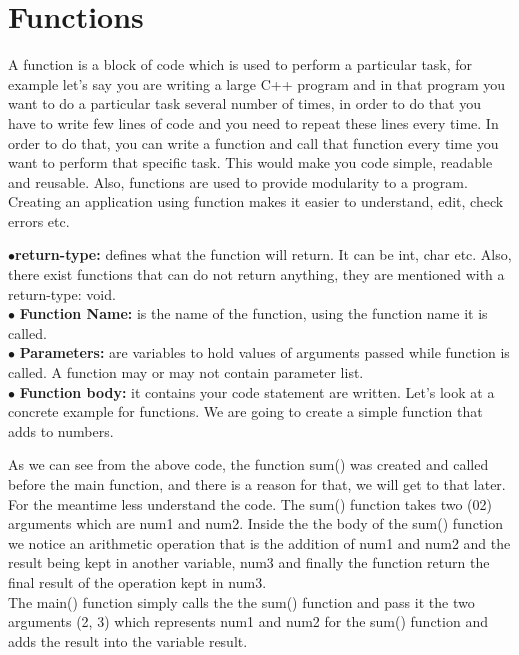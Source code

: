 \documentclass[11pt, a4paper]{article}
\begin{document}
\newpage
\section{Functions}
A function is a block of code which is used to perform a particular task,
for example let’s say you are writing a large C++ program and in that program
you want to do a particular task several number of times, in order to do that you
have to write few lines of code and you need
to repeat these lines every time. In order
to do that, you can write a function and call that function every time you
want to perform that specific task. This would make you code simple,
readable and reusable. Also, functions are used to provide modularity to a program.
Creating an application using function makes it easier to understand, edit,
check errors etc.

$\bullet$\textbf{return-type:} defines what the function will return. It can be int,
char etc. Also, there exist functions that can do not return anything, they are mentioned
with a return-type: void.\\
$\bullet$ \textbf{Function Name:} is the name of the function, using the function
name it is called.\\
$\bullet$ \textbf{Parameters:} are variables to hold values of arguments passed while
function is called. A function may or may not contain parameter list.\\
$\bullet$ \textbf{Function body:} it contains your code statement are written.
Let's look at a concrete example for functions. We are going to create a simple function that
adds to numbers.

As we can see from the above code, the function sum() was created and called before the main
function, and there is a reason for that, we will get to that later. For the meantime
less understand the code. The sum() function takes two (02) arguments which are
num1 and num2. Inside the the body of the sum() function we notice an arithmetic
operation that is the addition of num1 and num2 and the result being kept in another
variable, num3 and finally the function return the final result of the operation kept
in num3.\\
The main() function simply calls the the sum() function and pass it the two arguments
(2, 3) which represents num1 and num2 for the sum() function and adds the result
into the variable result.
\end{document}
